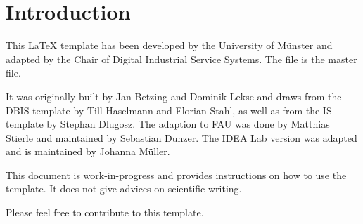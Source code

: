 \chapter{Introduction}
This \LaTeX \- template has been developed by the University of M\"unster and adapted by the Chair of Digital Industrial Service Systems. The file  is the master file.

It was originally built by  Jan Betzing and Dominik Lekse and draws from the DBIS template by Till Haselmann and Florian Stahl, as well as from the IS template by Stephan Dlugosz. The adaption to FAU was done by Matthias Stierle and maintained by Sebastian Dunzer. The IDEA Lab version was adapted and is maintained by Johanna M\"uller.

This document is work-in-progress and provides instructions on how to use the template. It does not give advices on scientific writing.

Please feel free to contribute to this template.
